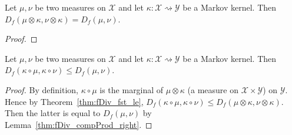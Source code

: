 \begin{lemma}
  \label{thm:fDiv_compProd_right}
  Let $\mu, \nu$ be two measures on $\mathcal X$ and let $\kappa : \mathcal X \rightsquigarrow \mathcal Y$ be a Markov kernel.
  Then $D_f(\mu \otimes \kappa, \nu \otimes \kappa) = D_f(\mu, \nu)$.
\end{lemma}

\begin{proof}
\end{proof}

\begin{theorem}
  \label{thm:fDiv_data_proc}
  Let $\mu, \nu$ be two measures on $\mathcal X$ and let $\kappa : \mathcal X \rightsquigarrow \mathcal Y$ be a Markov kernel.
  Then $D_f(\kappa \circ \mu, \kappa \circ \nu) \le D_f(\mu, \nu)$.
\end{theorem}

\begin{proof}
By definition, $\kappa \circ \mu$ is the marginal of $\mu \otimes \kappa$ (a measure on $\mathcal X \times \mathcal Y$) on $\mathcal Y$. Hence by Theorem~\ref{thm:fDiv_fst_le}, $D_f(\kappa \circ \mu, \kappa \circ \nu) \le D_f(\mu \otimes \kappa, \nu \otimes \kappa)$. Then the latter is equal to $D_f(\mu, \nu)$ by Lemma~\ref{thm:fDiv_compProd_right}.
\end{proof}
